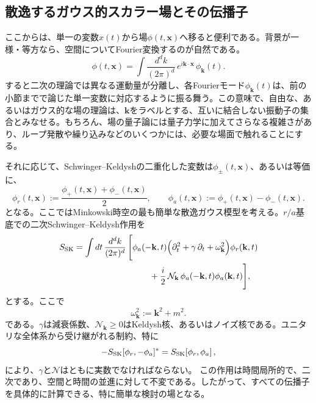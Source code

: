 \documentclass[a4paper,11pt,oneside]{article}
\theoremstyle{definition}
\numberwithin{equation}{section}
\begin{document}
\subsection{散逸するガウス的スカラー場とその伝播子}



ここからは、単一の変数$ x(t)$から場$\phi(t,\mathbf x) $へ移ると便利である。背景が一様・等方なら、空間についてFourier変換するのが自然である。
\begin{equation}
\phi(t,\mathbf x)
=
\int \frac{d^d k}{(2\pi)^d}\,
e^{i\mathbf k\cdot \mathbf x}\,\phi_{\mathbf k}(t) .
\end{equation}
すると二次の理論では異なる運動量が分離し、各Fourierモード\(\phi_{\mathbf k}(t)\)は、前の小節までで論じた単一変数に対応するように振る舞う。この意味で、自由な、あるいはガウス的な場の理論は、\(\mathbf k\)をラベルとする、互いに結合しない振動子の集合とみなせる。もちろん、場の量子論には量子力学に加えてさらなる複雑さがあり、ループ発散や繰り込みなどのいくつかには、必要な場面で触れることにする。



それに応じて、Schwinger--Keldyshの二重化した変数は\(\phi_\pm(t,\mathbf x)\)、あるいは等価に、
\begin{equation}
\phi_r(t,\mathbf x):=\frac{\phi_+(t,\mathbf x)+\phi_-(t,\mathbf x)}{2},
\qquad
\phi_a(t,\mathbf x):=\phi_+(t,\mathbf x)-\phi_-(t,\mathbf x) .
\end{equation}
となる。ここではMinkowski時空の最も簡単な散逸ガウス模型を考える。\(r/a\)基底での二次Schwinger--Keldysh作用を
\begin{align}\label{DissipativeFieldAction}
S_{\rm SK}
=
\int dt\,\frac{d^d k}{(2\pi)^d}\,
\Bigg[
&\phi_a(-\mathbf k,t)
\Bigl(
\partial_t^2+\gamma\,\partial_t+\omega_{\mathbf k}^2
\Bigr)\phi_r(\mathbf k,t)
\nonumber\\
&\qquad
+\frac{i}{2}\,\mathcal N_{\mathbf k}\,
\phi_a(-\mathbf k,t)\phi_a(\mathbf k,t)
\Bigg] ,
\end{align}
とする。ここで
\begin{equation}
\omega_{\mathbf k}^2:=\mathbf k^2+m^2 .
\end{equation}
である。\(\gamma\)は減衰係数、\(\mathcal N_{\mathbf k}\geq 0\)はKeldysh核、あるいはノイズ核である。ユニタリな全体系から受け継がれる制約、特に
\[ -S_{\rm SK}[\phi_{r},-\phi_{a}]^{*}=S_{\rm SK}[\phi_{r},\phi_{a}]\,, \]
により、$ \gamma $と$ \mathcal{N}$はともに実数でなければならない。
この作用は時間局所的で、二次であり、空間と時間の並進に対して不変である。したがって、すべての伝播子を具体的に計算できる、特に簡単な検討の場となる。
\end{document}
